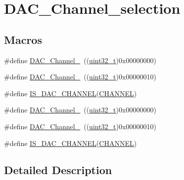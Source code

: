 \hypertarget{group___d_a_c___channel__selection}{}\section{D\+A\+C\+\_\+\+Channel\+\_\+selection}
\label{group___d_a_c___channel__selection}
\subsection*{Macros}
\begin{DoxyCompactItemize}
\item 
\#define \hyperlink{group___d_a_c___channel__selection_gacf6585474ed2a302b69a3725daa91555}{D\+A\+C\+\_\+\+Channel\+\_}~((\hyperlink{_p_e___types_8h_a33594304e786b158f3fb30289278f5af}{uint32\+\_\+t})0x00000000)
\item 
\#define \hyperlink{group___d_a_c___channel__selection_ga0e9b0096866bb06e8a82b3e4e66943bb}{D\+A\+C\+\_\+\+Channel\+\_}~((\hyperlink{_p_e___types_8h_a33594304e786b158f3fb30289278f5af}{uint32\+\_\+t})0x00000010)
\item 
\#define \hyperlink{group___d_a_c___channel__selection_gafb2b9bdaccb3a5e3396925d7cba02cc3}{I\+S\+\_\+\+D\+A\+C\+\_\+\+C\+H\+A\+N\+N\+EL}(\hyperlink{samr21__xpro_200std__low__power__mode_200std__low__power__mode_8c_ace6a11e892466500d47d1f45f042bc53}{C\+H\+A\+N\+N\+EL})
\item 
\#define \hyperlink{group___d_a_c___channel__selection_gacf6585474ed2a302b69a3725daa91555}{D\+A\+C\+\_\+\+Channel\+\_}~((\hyperlink{_p_e___types_8h_a33594304e786b158f3fb30289278f5af}{uint32\+\_\+t})0x00000000)
\item 
\#define \hyperlink{group___d_a_c___channel__selection_ga0e9b0096866bb06e8a82b3e4e66943bb}{D\+A\+C\+\_\+\+Channel\+\_}~((\hyperlink{_p_e___types_8h_a33594304e786b158f3fb30289278f5af}{uint32\+\_\+t})0x00000010)
\item 
\#define \hyperlink{group___d_a_c___channel__selection_gafb2b9bdaccb3a5e3396925d7cba02cc3}{I\+S\+\_\+\+D\+A\+C\+\_\+\+C\+H\+A\+N\+N\+EL}(\hyperlink{samr21__xpro_200std__low__power__mode_200std__low__power__mode_8c_ace6a11e892466500d47d1f45f042bc53}{C\+H\+A\+N\+N\+EL})
\end{DoxyCompactItemize}


\subsection{Detailed Description}


